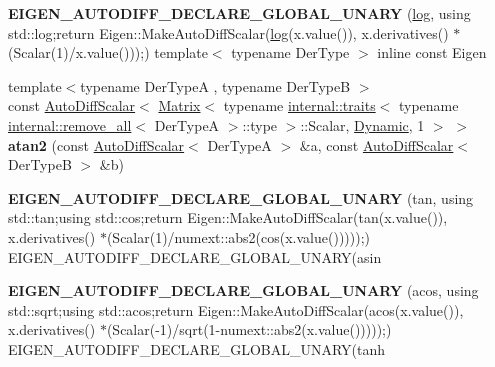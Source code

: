 \begin{DoxyCompactItemize}
\item 
\mbox{\label{namespace_eigen_aa9772823dd0a8d24c98fbae45ca16802}} 
{\bfseries E\+I\+G\+E\+N\+\_\+\+A\+U\+T\+O\+D\+I\+F\+F\+\_\+\+D\+E\+C\+L\+A\+R\+E\+\_\+\+G\+L\+O\+B\+A\+L\+\_\+\+U\+N\+A\+RY} (\hyperlink{structlog}{log}, using std\+::log;return Eigen\+::\+Make\+Auto\+Diff\+Scalar(\hyperlink{structlog}{log}(x.\+value()), x.\+derivatives() $\ast$(Scalar(1)/x.\+value()));) template$<$ typename Der\+Type $>$ inline const Eigen
\item 
\mbox{\label{namespace_eigen_aabbac4a376874ce85e22f24da1845008}} 
{\footnotesize template$<$typename Der\+TypeA , typename Der\+TypeB $>$ }\\const \hyperlink{class_eigen_1_1_auto_diff_scalar}{Auto\+Diff\+Scalar}$<$ \hyperlink{group___core___module_class_eigen_1_1_matrix}{Matrix}$<$ typename \hyperlink{struct_eigen_1_1internal_1_1traits}{internal\+::traits}$<$ typename \hyperlink{struct_eigen_1_1internal_1_1remove__all}{internal\+::remove\+\_\+all}$<$ Der\+TypeA $>$\+::type $>$\+::Scalar, \hyperlink{namespace_eigen_ad81fa7195215a0ce30017dfac309f0b2}{Dynamic}, 1 $>$ $>$ {\bfseries atan2} (const \hyperlink{class_eigen_1_1_auto_diff_scalar}{Auto\+Diff\+Scalar}$<$ Der\+TypeA $>$ \&a, const \hyperlink{class_eigen_1_1_auto_diff_scalar}{Auto\+Diff\+Scalar}$<$ Der\+TypeB $>$ \&b)
\item 
\mbox{\label{namespace_eigen_a212ff33d56ffe0384059b78e7e8a8142}} 
{\bfseries E\+I\+G\+E\+N\+\_\+\+A\+U\+T\+O\+D\+I\+F\+F\+\_\+\+D\+E\+C\+L\+A\+R\+E\+\_\+\+G\+L\+O\+B\+A\+L\+\_\+\+U\+N\+A\+RY} (tan, using std\+::tan;using std\+::cos;return Eigen\+::\+Make\+Auto\+Diff\+Scalar(tan(x.\+value()), x.\+derivatives() $\ast$(Scalar(1)/numext\+::abs2(cos(x.\+value()))));) E\+I\+G\+E\+N\+\_\+\+A\+U\+T\+O\+D\+I\+F\+F\+\_\+\+D\+E\+C\+L\+A\+R\+E\+\_\+\+G\+L\+O\+B\+A\+L\+\_\+\+U\+N\+A\+RY(asin
\item 
\mbox{\label{namespace_eigen_a3af291629130d7e1494b0c17b7413f86}} 
{\bfseries E\+I\+G\+E\+N\+\_\+\+A\+U\+T\+O\+D\+I\+F\+F\+\_\+\+D\+E\+C\+L\+A\+R\+E\+\_\+\+G\+L\+O\+B\+A\+L\+\_\+\+U\+N\+A\+RY} (acos, using std\+::sqrt;using std\+::acos;return Eigen\+::\+Make\+Auto\+Diff\+Scalar(acos(x.\+value()), x.\+derivatives() $\ast$(Scalar(-\/1)/sqrt(1-\/numext\+::abs2(x.\+value()))));) E\+I\+G\+E\+N\+\_\+\+A\+U\+T\+O\+D\+I\+F\+F\+\_\+\+D\+E\+C\+L\+A\+R\+E\+\_\+\+G\+L\+O\+B\+A\+L\+\_\+\+U\+N\+A\+RY(tanh

\end{DoxyCompactItemize}
